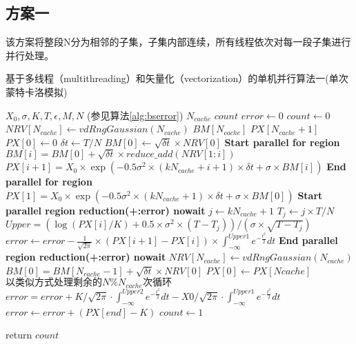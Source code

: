 \subsection{方案一}
该方案将整段N分为相邻的子集，子集内部连续，所有线程依次对每一段子集进行并行处理。
\begin{algorithm}
  \caption{基于多线程（multithreading）和矢量化（vectorization）的单机并行算法一(单次蒙特卡洛模拟)}
  \label{alg:omp1}
  \begin{algorithmic}[1]
    \Require $X_0, \sigma, K, T, \epsilon, M, N$ (参见算法\ref{alg:bserror})
    \Require $N_{cache}$ 
    \Ensure $count$
    \State $error \gets 0$
    \State $count \gets 0$
    \State $NRV[N_{cache}] \gets vdRngGaussian(N_{cache})$ 
    \State $BM[N_{cache}]$ 
    \State $PX[N_{cache}+1]$ 
    \State $PX[0] \gets 0$
    \State $\delta t \gets T/N$
    \State $BM[0] \gets \sqrt{\delta t} \times NRV[0]$
    \State \textbf{Start parallel for region} 
    \State $BM[i] = BM[0] + \sqrt{\delta t}\times reduce\_add(NRV[1:i])$ 
    \State $PX[i+1] = X_0 \times \exp(-0.5 \sigma^2 \times (kN_{cache}+i+1) \times \delta t + \sigma \times BM[i])$
    \EndFor
    \State \textbf{End parallel for region}
    \State $PX[1] = X_0 \times \exp(-0.5 \sigma^2 \times (kN_{cache}+1) \times \delta t + \sigma \times BM[0])$
    \State \textbf{Start parallel region reduction(+:error) nowait}
    \State $j \gets kN_{cache}+1$
    \State $T_j \gets {j \times T}/{N}$
    \State $Upper = (\log(PX[i]/K)+0.5\times \sigma^2 \times (T-T_j))/(\sigma \times \sqrt{T-T_j})$
    \State $error \gets error - \frac{1}{\sqrt{2\pi}}\times (PX[i+1]-PX[i])\times \int_{-\infty}^{Upper1}e^{-\frac{t^2}{2}}dt$
    \EndFor
    \State \textbf{End parallel region reduction(+:error) nowait}
    \State $NRV[N_{cache}] \gets vdRngGaussian(N_{cache})$ 
    \State $BM[0] = BM[N_{cache}-1] + \sqrt{\delta t}\times NRV[0]$
    \State $PX[0] \gets PX[Ncache]$
    \EndFor
    \State $以类似方式处理剩余的N\%N_{cache}次循环$
    \State $error = error + K/\sqrt{2\pi} \cdot \int_{-\infty}^{Upper2}e^{-\frac{t^2}{2}}dt -X0/\sqrt{2\pi}\cdot \int_{-\infty}^{Upper1}e^{-\frac{t^2}{2}}dt$
    \State $error \gets error + (PX[end]-K)$
    \EndIf
    \State $count \gets 1$
    \EndIf
    
    \State return $count$
    
    \EndProcedure
  \end{algorithmic}
\end{algorithm}
